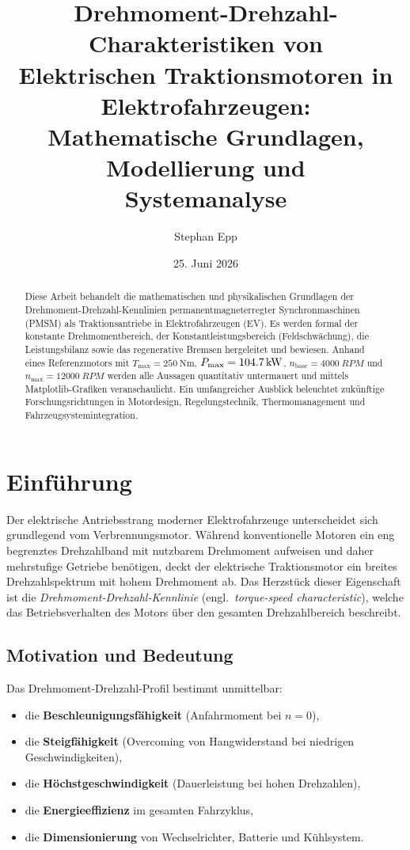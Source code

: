﻿\documentclass[a4paper,12pt]{article}
\title{Drehmoment-Drehzahl-Charakteristiken von\\
Elektrischen Traktionsmotoren in Elektrofahrzeugen:\\
Mathematische Grundlagen, Modellierung und\\
Systemanalyse}
\author{Stephan Epp}
\date{25. Juni 2026}
\theoremstyle{definition}
\begin{document}
\maketitle

\begin{abstract}
Diese Arbeit behandelt die mathematischen und physikalischen Grundlagen der
Drehmoment-Drehzahl-Kennlinien permanentmagneterregter Synchronmaschinen (PMSM)
als Traktionsantriebe in Elektrofahrzeugen (EV). Es werden formal der konstante
Drehmomentbereich, der Konstantleistungsbereich (Feldschwächung), die
Leistungsbilanz sowie das regenerative Bremsen hergeleitet und bewiesen.
Anhand eines Referenzmotors mit $T_{\max} = \SI{250}{\newton\metre}$,
$P_{\max} = \SI{104{,}7}{\kilo\watt}$, $n_{\mathrm{base}} = \SI{4000}{RPM}$ und
$n_{\max} = \SI{12000}{RPM}$ werden alle Aussagen quantitativ untermauert und
mittels Matplotlib-Grafiken veranschaulicht. Ein umfangreicher Ausblick
beleuchtet zukünftige Forschungsrichtungen in Motordesign, Regelungstechnik,
Thermomanagement und Fahrzeugsystemintegration.
\end{abstract}

\tableofcontents
\newpage

\section{Einführung}

Der elektrische Antriebsstrang moderner Elektrofahrzeuge unterscheidet sich
grundlegend vom Verbrennungsmotor. Während konventionelle Motoren ein eng
begrenztes Drehzahlband mit nutzbarem Drehmoment aufweisen und daher mehrstufige
Getriebe benötigen, deckt der elektrische Traktionsmotor ein breites Drehzahlspektrum
mit hohem Drehmoment ab. Das Herzstück dieser Eigenschaft ist die
\emph{Drehmoment-Drehzahl-Kennlinie} (engl.\ \emph{torque-speed characteristic}),
welche das Betriebsverhalten des Motors über den gesamten Drehzahlbereich beschreibt.

\subsection{Motivation und Bedeutung}

Das Drehmoment-Drehzahl-Profil bestimmt unmittelbar:
\begin{itemize}
    \item die \textbf{Beschleunigungsfähigkeit} (Anfahrmoment bei $n = 0$),
    \item die \textbf{Steigfähigkeit} (Overcoming von Hangwiderstand bei niedrigen
          Geschwindigkeiten),
    \item die \textbf{Höchstgeschwindigkeit} (Dauerleistung bei hohen Drehzahlen),
    \item die \textbf{Energieeffizienz} im gesamten Fahrzyklus,
    \item die \textbf{Dimensionierung} von Wechselrichter, Batterie und Kühlsystem.
\end{itemize}
\end{document}
